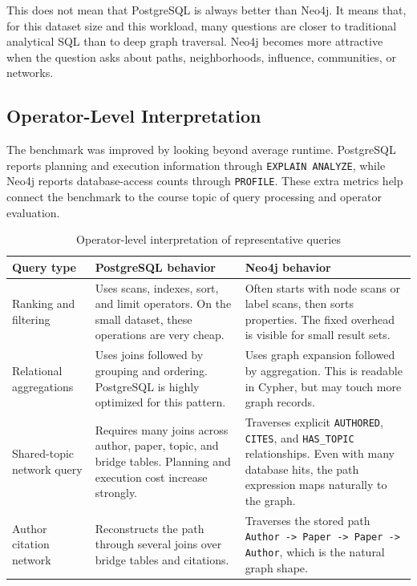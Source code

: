 \documentclass[11pt]{article}
\begin{document}
This does not mean that PostgreSQL is always better than Neo4j.
It means that, for this dataset size and this workload, many questions are closer to traditional analytical SQL than to deep graph traversal.
Neo4j becomes more attractive when the question asks about paths, neighborhoods, influence, communities, or networks.

\subsection{Operator-Level Interpretation}

The benchmark was improved by looking beyond average runtime.
PostgreSQL reports planning and execution information through \texttt{EXPLAIN ANALYZE}, while Neo4j reports database-access counts through \texttt{PROFILE}.
These extra metrics help connect the benchmark to the course topic of query processing and operator evaluation.

\begin{table}[H]
\centering
\caption{Operator-level interpretation of representative queries}
\label{tab:operator-analysis}
\small
\begin{tabular}{|p{}|p{}|p{}|}
\hline
\textbf{Query type} & \textbf{PostgreSQL behavior} & \textbf{Neo4j behavior} \\
\hline
Ranking and filtering & Uses scans, indexes, sort, and limit operators. On the small dataset, these operations are very cheap. & Often starts with node scans or label scans, then sorts properties. The fixed overhead is visible for small result sets. \\
\hline
Relational aggregations & Uses joins followed by grouping and ordering. PostgreSQL is highly optimized for this pattern. & Uses graph expansion followed by aggregation. This is readable in Cypher, but may touch more graph records. \\
\hline
Shared-topic network query & Requires many joins across author, paper, topic, and bridge tables. Planning and execution cost increase strongly. & Traverses explicit \texttt{AUTHORED}, \texttt{CITES}, and \texttt{HAS\_TOPIC} relationships. Even with many database hits, the path expression maps naturally to the graph. \\
\hline
Author citation network & Reconstructs the path through several joins over bridge tables and citations. & Traverses the stored path \texttt{Author -> Paper -> Paper -> Author}, which is the natural graph shape. \\
\hline
\end{tabular}
\normalsize
\end{table}
\end{document}
